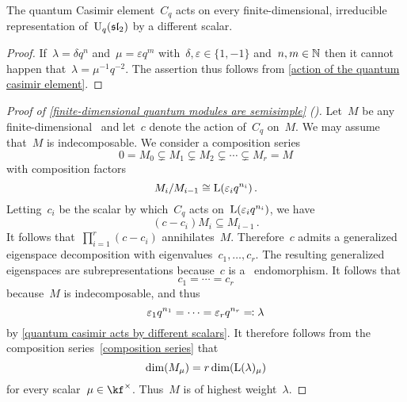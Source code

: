 \documentclass[a4paper, 11pt, oneside]{scrartcl}
\begin{document}
\begin{corollary}
  \label{quantum casimir acts by different scalars}
  The quantum Casimir element~$C_q$ acts on every finite-dimensional, irreducible representation of~$\operatorname{U}_q(\mathfrak{sl}_2)$ by a different scalar.
\end{corollary}

\begin{proof}
  If~$\lambda = \delta q^n$ and~$\mu = \varepsilon q^m$ with~$\delta, \varepsilon \in \{1, -1\}$ and~$n, m \in \mathbb{N}$ then it cannot happen that~$\lambda = \mu^{-1} q^{-2}$.
  The assertion thus follows from \cref{action of the quantum casimir element}.
\end{proof}

\begin{proof}[Proof of \cref{finite-dimensional quantum modules are semisimple} ({\cite[Theorem~2.9]{jantzen_quantum}})]
  Let~$M$ be any finite-dimensional~ and let~$c$ denote the action of~$C_q$ on~$M$.
  We may assume that~$M$ is indecomposable.
  We consider a composition series
  \begin{equation}
    \label{composition series}
    0
    =
    M_0
    \subsetneq
    M_1
    \subsetneq
    M_2
    \subsetneq
    \dotsb
    \subsetneq
    M_r
    =
    M
  \end{equation}
  with composition factors
  \[
    M_i/M_{i-1}
    \cong
    \operatorname{L}(\varepsilon_i q^{n_i}) \,.
  \]
  Letting~$c_i$ be the scalar by which~$C_q$ acts on~$\operatorname{L}(\varepsilon_i q^{n_i})$, we have
  \[
    (c - c_i) M_i \subseteq M_{i-1} \,.
  \]
  It follows that~$\prod_{i=1}^r (c - c_i)$ annihilates~$M$.
  Therefore~$c$ admits a generalized eigenspace decomposition with eigenvalues~$c_1, \dotsc, c_r$.
  The resulting generalized eigenspaces are subrepresentations because~$c$ is a~ endomorphism.
  It follows that
  \[
    c_1 = \dotsb = c_r
  \]
  because~$M$ is indecomposable, and thus
  \[
    \varepsilon_1 q^{n_1}
    =
    \dotsb
    =
    \varepsilon_r q^{n_r}
    \eqqcolon
    \lambda
  \]
  by \cref{quantum casimir acts by different scalars}.
  It therefore follows from the composition series~\eqref{composition series} that
  \[
    \dim( M_\mu )
    =
    r \dim( \operatorname{L}(\lambda)_\mu )
  \]
  for every scalar~$\mu \in \kf^\times$.
  Thus~$M$ is of highest weight~$\lambda$.


\end{proof}
\end{document}
